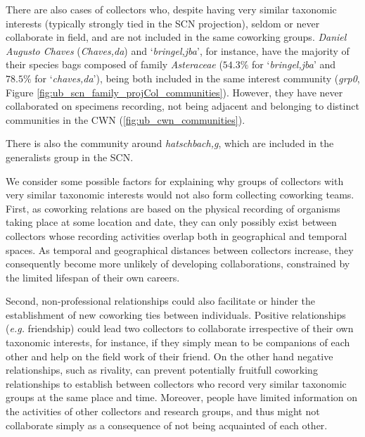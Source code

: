 There are also cases of collectors who, despite having very similar taxonomic interests (typically strongly tied in the SCN projection), seldom or never collaborate in field, and are not included in the same coworking groups.
\textit{Daniel Augusto Chaves} (\textit{Chaves,da}) and `\textit{bringel,jba}', for instance, have the majority of their species bags composed of family \textit{Asteraceae} ($54.3\%$ for `\textit{bringel,jba}' and $78.5\%$ for `\textit{chaves,da}'), being both included in the same interest community (\textit{grp0}, Figure \ref{fig:ub_scn_family_projCol_communities}).
However, they have never collaborated on specimens recording, not being adjacent and belonging to distinct communities in the CWN (\ref{fig:ub_cwn_communities}).

There is also the community around \textit{hatschbach,g}, which are included in the generalists group in the SCN.

We consider some possible factors for explaining why groups of collectors with very similar taxonomic interests would not also form collecting coworking teams.
%
First, as coworking relations are based on the physical recording of organisms taking place at some location and date, they can only possibly exist between collectors whose recording activities overlap both in geographical and temporal spaces.
As temporal and geographical distances between collectors increase, they consequently become more unlikely of developing collaborations, constrained by the limited lifespan of their own careers.

Second, non-professional relationships could also facilitate or hinder the establishment of new coworking ties between individuals. 
Positive relationships (\textit{e.g.} friendship) could lead two collectors to collaborate irrespective of their own taxonomic interests, for instance, if they simply mean to be companions of each other and help on the field work of their friend.
On the other hand negative relationships, such as rivality, can prevent potentially fruitfull coworking relationships to establish between collectors who record very similar taxonomic groups at the same place and time.
Moreover, people have limited information on the activities of other collectors and research groups, and thus might not collaborate simply as a consequence of not being acquainted of each other.

